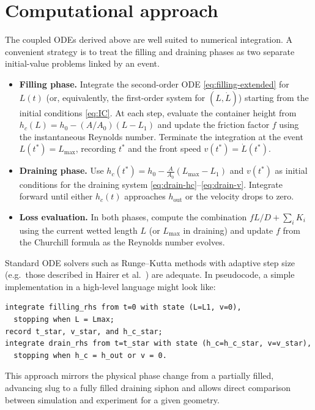 \documentclass[11pt]{article}
\begin{document}
\section{Computational approach}
\label{sec:comp}
The coupled ODEs derived above are well suited to numerical integration. A convenient
strategy is to treat the filling and draining phases as two separate initial-value problems
linked by an event.
\begin{itemize}
  \item \textbf{Filling phase.} Integrate the second-order ODE \eqref{eq:filling-extended}
        for $L(t)$ (or, equivalently, the first-order system for $(L,\dot L)$) starting from
        the initial conditions \eqref{eq:IC}. At each step, evaluate the container height from
        $h_c(L)=h_0-(A/A_0)(L-L_1)$ and update the friction factor $f$ using the instantaneous
        Reynolds number. Terminate the integration at the event $L(t^*)=L_{\max}$, recording
        $t^*$ and the front speed $v(t^*)=\dot L(t^*)$.
  \item \textbf{Draining phase.} Use $h_c(t^*) = h_0 - \tfrac{A}{A_0}(L_{\max}-L_1)$ and
        $v(t^*)$ as initial conditions for the draining system \eqref{eq:drain-hc}--\eqref{eq:drain-v}.
        Integrate forward until either $h_c(t)$ approaches $h_{\text{out}}$ or the velocity
        drops to zero.
  \item \textbf{Loss evaluation.} In both phases, compute the combination
        $fL/D+\sum_i K_i$ using the current wetted length $L$ (or $L_{\max}$ in draining)
        and update $f$ from the Churchill formula as the Reynolds number evolves.
\end{itemize}
Standard ODE solvers such as Runge--Kutta methods with adaptive step size (e.g.\ those
described in Hairer et al.~\cite{hairer}) are adequate. In pseudocode, a simple implementation
in a high-level language might look like:
\begin{verbatim}
integrate filling_rhs from t=0 with state (L=L1, v=0),
  stopping when L = Lmax;
record t_star, v_star, and h_c_star;
integrate drain_rhs from t=t_star with state (h_c=h_c_star, v=v_star),
  stopping when h_c = h_out or v = 0.
\end{verbatim}
This approach mirrors the physical phase change from a partially filled, advancing slug
to a fully filled draining siphon and allows direct comparison between simulation and
experiment for a given geometry.
\end{document}
